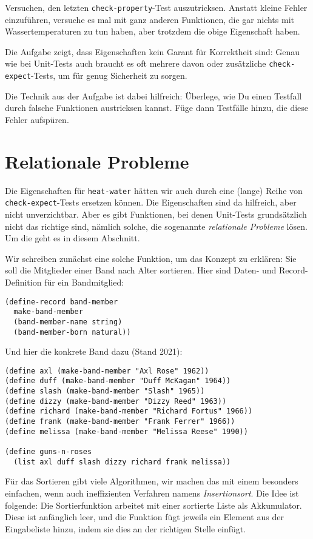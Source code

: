 \begin{aufgabeinline}
  Versuchen, den letzten \lstinline{check-property}-Test
  auszutricksen.  Anstatt kleine Fehler einzuführen, versuche es mal
  mit ganz anderen Funktionen, die gar nichts mit Wassertemperaturen
  zu tun haben, aber trotzdem die obige Eigenschaft haben.
\end{aufgabeinline}
%
Die Aufgabe zeigt, dass Eigenschaften kein Garant für Korrektheit
sind: Genau wie bei Unit-Tests auch braucht es oft mehrere davon oder
zusätzliche \lstinline{check-expect}-Tests, um für genug Sicherheit zu
sorgen.

Die Technik aus der Aufgabe ist dabei hilfreich: Überlege, wie Du
einen Testfall durch falsche Funktionen austricksen kannst.  Füge dann
Testfälle hinzu, die diese Fehler aufspüren.



\section{Relationale Probleme}

Die Eigenschaften für \lstinline{heat-water} hätten wir auch durch
eine (lange) Reihe von \lstinline{check-expect}-Tests ersetzen können.
Die Eigenschaften sind da hilfreich, aber nicht unverzichtbar.  Aber
es gibt Funktionen, bei denen Unit-Tests grundsätzlich nicht das
richtige sind, nämlich solche, die sogenannte \textit{relationale
  Probleme} lösen.  Um die geht es in diesem Abschnitt.

Wir schreiben zunächst eine solche Funktion, um das Konzept zu
erklären: Sie soll die Mitglieder einer Band nach Alter sortieren.
Hier sind Daten- und Record-Definition für ein Bandmitglied:
%
\begin{lstlisting}
(define-record band-member
  make-band-member
  (band-member-name string)
  (band-member-born natural))
\end{lstlisting}
%
Und hier die konkrete Band dazu (Stand 2021):
%
\begin{lstlisting}
(define axl (make-band-member "Axl Rose" 1962))
(define duff (make-band-member "Duff McKagan" 1964))
(define slash (make-band-member "Slash" 1965))
(define dizzy (make-band-member "Dizzy Reed" 1963))
(define richard (make-band-member "Richard Fortus" 1966))
(define frank (make-band-member "Frank Ferrer" 1966))
(define melissa (make-band-member "Melissa Reese" 1990))

(define guns-n-roses
  (list axl duff slash dizzy richard frank melissa))
\end{lstlisting}
%
Für das Sortieren gibt viele Algorithmen, wir machen das mit einem
besonders einfachen, wenn auch ineffizienten Verfahren namens
\textit{Insertionsort}.  Die Idee ist folgende:
Die Sortierfunktion arbeitet mit einer sortierte Liste als
Akkumulator.  Diese ist anfänglich leer, und die Funktion fügt jeweils
ein Element aus der Eingabeliste hinzu, indem sie dies an der
richtigen Stelle einfügt.


